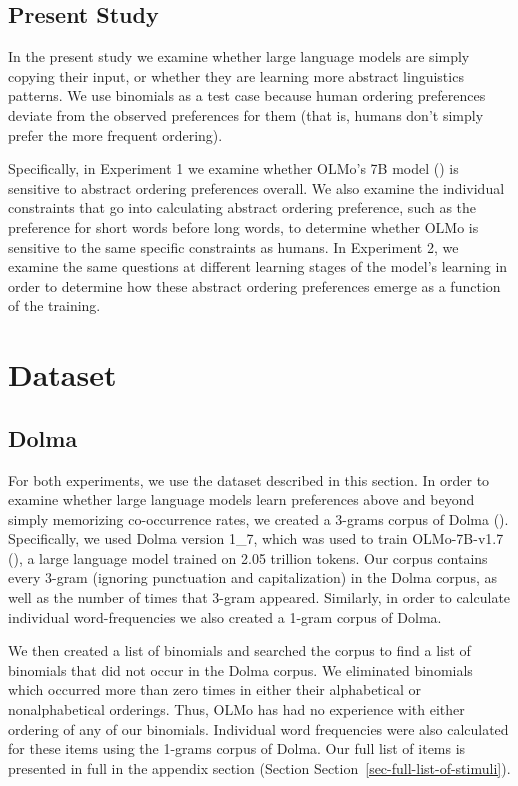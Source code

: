 \documentclass[
  nottoc]{article}
\begin{document}
\subsection{Present Study}\label{present-study}

In the present study we examine whether large language models are simply
copying their input, or whether they are learning more abstract
linguistics patterns. We use binomials as a test case because human
ordering preferences deviate from the observed preferences for them
(that is, humans don't simply prefer the more frequent ordering).

Specifically, in Experiment 1 we examine whether OLMo's 7B model
() is sensitive to abstract ordering preferences overall. We also
examine the individual constraints that go into calculating abstract
ordering preference, such as the preference for short words before long
words, to determine whether OLMo is sensitive to the same specific
constraints as humans. In Experiment 2, we examine the same questions at
different learning stages of the model's learning in order to determine
how these abstract ordering preferences emerge as a function of the
training.

\section{Dataset}\label{dataset}

\subsection{Dolma}\label{dolma}

For both experiments, we use the dataset described in this section. In
order to examine whether large language models learn preferences above
and beyond simply memorizing co-occurrence rates, we created a 3-grams
corpus of Dolma (). Specifically, we used Dolma version 1\_7, which was used to
train OLMo-7B-v1.7
(), a large language model trained on 2.05 trillion tokens. Our
corpus contains every 3-gram (ignoring punctuation and capitalization)
in the Dolma corpus, as well as the number of times that 3-gram
appeared. Similarly, in order to calculate individual word-frequencies
we also created a 1-gram corpus of Dolma.

We then created a list of binomials and searched the corpus to find a
list of binomials that did not occur in the Dolma corpus. We eliminated
binomials which occurred more than zero times in either their
alphabetical or nonalphabetical orderings. Thus, OLMo has had no
experience with either ordering of any of our binomials. Individual word
frequencies were also calculated for these items using the 1-grams
corpus of Dolma. Our full list of items is presented in full in the
appendix section (Section Section~\ref{sec-full-list-of-stimuli}).
\end{document}

